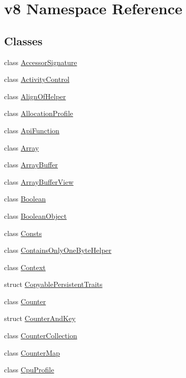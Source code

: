 \hypertarget{namespacev8}{}\section{v8 Namespace Reference}
\label{namespacev8}
\subsection*{Classes}
\begin{DoxyCompactItemize}
\item 
class \hyperlink{classv8_1_1_accessor_signature}{Accessor\+Signature}
\item 
class \hyperlink{classv8_1_1_activity_control}{Activity\+Control}
\item 
class \hyperlink{classv8_1_1_align_of_helper}{Align\+Of\+Helper}
\item 
class \hyperlink{classv8_1_1_allocation_profile}{Allocation\+Profile}
\item 
class \hyperlink{classv8_1_1_api_function}{Api\+Function}
\item 
class \hyperlink{classv8_1_1_array}{Array}
\item 
class \hyperlink{classv8_1_1_array_buffer}{Array\+Buffer}
\item 
class \hyperlink{classv8_1_1_array_buffer_view}{Array\+Buffer\+View}
\item 
class \hyperlink{classv8_1_1_boolean}{Boolean}
\item 
class \hyperlink{classv8_1_1_boolean_object}{Boolean\+Object}
\item 
class \hyperlink{classv8_1_1_consts}{Consts}
\item 
class \hyperlink{classv8_1_1_contains_only_one_byte_helper}{Contains\+Only\+One\+Byte\+Helper}
\item 
class \hyperlink{classv8_1_1_context}{Context}
\item 
struct \hyperlink{structv8_1_1_copyable_persistent_traits}{Copyable\+Persistent\+Traits}
\item 
class \hyperlink{classv8_1_1_counter}{Counter}
\item 
struct \hyperlink{structv8_1_1_counter_and_key}{Counter\+And\+Key}
\item 
class \hyperlink{classv8_1_1_counter_collection}{Counter\+Collection}
\item 
class \hyperlink{classv8_1_1_counter_map}{Counter\+Map}
\item 
class \hyperlink{classv8_1_1_cpu_profile}{Cpu\+Profile}
\item 

\end{DoxyCompactItemize}
